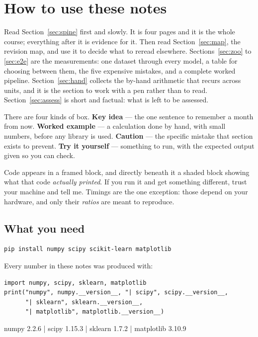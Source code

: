 \documentclass[11pt]{article}
\begin{document}
\tableofcontents
\medskip

\section{How to use these notes}
\label{sec:how}

Read Section~\ref{sec:spine} first and slowly. It is four pages and it is the
whole course; everything after it is evidence for it. Then read
Section~\ref{sec:map}, the revision map, and use it to decide what to reread
elsewhere. Sections~\ref{sec:zoo} to \ref{sec:e2e} are the measurements: one
dataset through every model, a table for choosing between them, the five
expensive mistakes, and a complete worked pipeline. Section~\ref{sec:hand}
collects the by-hand arithmetic that recurs across units, and it is the
section to work with a pen rather than to read. Section~\ref{sec:assess} is
short and factual: what is left to be assessed.

There are four kinds of box. \textbf{Key idea} --- the one sentence to
remember a month from now. \textbf{Worked example} --- a calculation done by
hand, with small numbers, before any library is used. \textbf{Caution} --- the
specific mistake that section exists to prevent. \textbf{Try it yourself} ---
something to run, with the expected output given so you can check.

Code appears in a framed block, and directly beneath it a shaded block showing
what that code \emph{actually printed}. If you run it and get something
different, trust your machine and tell me. Timings are the one exception:
those depend on your hardware, and only their \emph{ratios} are meant to
reproduce.

\subsection{What you need}

\begin{lstlisting}
pip install numpy scipy scikit-learn matplotlib
\end{lstlisting}

Every number in these notes was produced with:

\begin{lstlisting}
import numpy, scipy, sklearn, matplotlib
print("numpy", numpy.__version__, "| scipy", scipy.__version__,
      "| sklearn", sklearn.__version__,
      "| matplotlib", matplotlib.__version__)
\end{lstlisting}
\begin{codeout}
numpy 2.2.6 | scipy 1.15.3 | sklearn 1.7.2 | matplotlib 3.10.9
\end{codeout}
\end{document}
